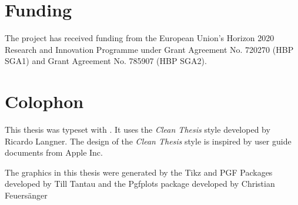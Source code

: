 \section*{Funding}
The project has received funding from the European Union’s Horizon 2020 Research and Innovation Programme under Grant Agreement No. 720270 (HBP SGA1) and Grant Agreement No. 785907 (HBP SGA2).
% 
\section*{Colophon}
This thesis was typeset with \LaTeXe.
It uses the \textit{Clean Thesis} style developed by Ricardo Langner.
The design of the \textit{Clean Thesis} style is inspired by user guide documents from Apple Inc.
\par
The graphics in this thesis were generated by the Tikz and PGF Packages developed by Till Tantau and the Pgfplots package developed by Christian Feuers{\"a}nger
